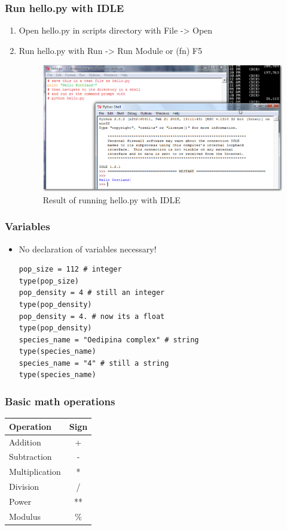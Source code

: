 \documentclass{beamer}
\begin{document}
\begin{frame}[fragile]
\frametitle{Run hello.py with IDLE}
\begin{enumerate}
\item Open hello.py in scripts directory with File -> Open
\item Run hello.py with Run -> Run Module or (fn) F5
  \begin{figure}
 \includegraphics[scale=0.4]{hello_idle.jpg} 
 \caption{Result of running hello.py with IDLE}
 \end{figure}
 \end{enumerate}
\end{frame}

\begin{frame}[fragile]
\frametitle{Variables}
\begin{itemize}
\item No declaration of variables necessary!
\begin{lstlisting}
pop_size = 112 # integer
type(pop_size)
pop_density = 4 # still an integer
type(pop_density)
pop_density = 4. # now its a float
type(pop_density)
species_name = "Oedipina complex" # string
type(species_name)
species_name = "4" # still a string
type(species_name)
\end{lstlisting}
\end{itemize}
\end{frame}

\begin{frame}[fragile]
\frametitle{Basic math operations}
\begin{center}
\begin{tabular}{lc} \hline
\rowcolor{UniBlue!100}Operation & Sign \\ \hline \hline
\rowcolor{UniBlue!75}Addition & + \\ \hline
\rowcolor{UniBlue!90}Subtraction & - \\ \hline
\rowcolor{UniBlue!75}Multiplication & * \\ \hline
\rowcolor{UniBlue!90}Division & / \\ \hline
\rowcolor{UniBlue!75}Power & ** \\ \hline
\rowcolor{UniBlue!90}Modulus & \% \\ \hline
\end{tabular}
\end{center}


\end{frame}
\end{document}
